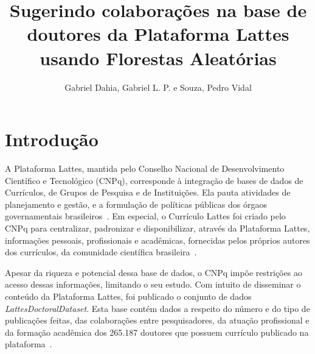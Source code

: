 \documentclass[12pt]{article}
\title{Sugerindo colaborações na base de doutores da Plataforma Lattes usando Florestas Aleatórias}
\author{Gabriel Dahia, Gabriel L. P. e Souza, Pedro Vidal}
\begin{document}
 

\maketitle

     


\section{Introdução}

A Plataforma Lattes, mantida pelo Conselho Nacional de Desenvolvimento Científico e Tecnológico (CNPq), corresponde à integração de bases de dados de Currículos, de Grupos de Pesquisa e de Instituições. Ela pauta atividades de planejamento e gestão, e a formulação de políticas públicas dos órgaos governamentais brasileiros~\cite{lattes-cnpq}.
Em especial, o Currículo Lattes foi criado pelo CNPq para centralizar, padronizar e disponibilizar, através da Plataforma Lattes, informações pessoais, profissionais e acadêmicas, fornecidas pelos próprios autores dos currículos, da comunidade científica brasileira~\cite{sucupira}.

Apesar da riqueza e potencial dessa base de dados, o CNPq impõe restrições ao acesso dessas informações, limitando o seu estudo.
Com intuito de disseminar o conteúdo da Plataforma Lattes, foi publicado o conjunto de dados \emph{LattesDoctoralDataset}.
Esta base contém dados a respeito do número e do tipo de publicações feitas, das colaborações entre pesquisadores, da atuação profissional e da formação acadêmica dos 265.187 doutores que possuem currículo publicado na plataforma~\cite{lattes-dataset}.
\end{document}
